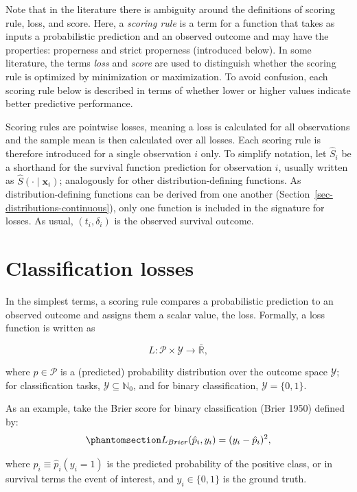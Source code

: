 \documentclass[
  letterpaper,
  krantz2]{style/krantz}
\begin{document}
Note that in the literature there is ambiguity around the definitions of
scoring rule, loss, and score. Here, a \emph{scoring rule} is a term for
a function that takes as inputs a probabilistic prediction and an
observed outcome and may have the properties: properness and strict
properness (introduced below). In some literature, the terms \emph{loss}
and \emph{score} are used to distinguish whether the scoring rule is
optimized by minimization or maximization. To avoid confusion, each
scoring rule below is described in terms of whether lower or higher
values indicate better predictive performance.

Scoring rules are pointwise losses, meaning a loss is calculated for all
observations and the sample mean is then calculated over all losses.
Each scoring rule is therefore introduced for a single observation \(i\)
only. To simplify notation, let \(\hat{S}_i\) be a shorthand for the
survival function prediction for observation \(i\), usually written as
\(\hat{S}(\cdot \mid \mathbf{x}_i)\); analogously for other
distribution-defining functions. As distribution-defining functions can
be derived from one another
(Section~\ref{sec-distributions-continuous}), only one function is
included in the signature for losses. As usual, \((t_i, \delta_i)\) is
the observed survival outcome.

\section{Classification losses}\label{classification-losses}

In the simplest terms, a scoring rule compares a probabilistic
prediction to an observed outcome and assigns them a scalar value, the
loss. Formally, a loss function is written as

\[
L: \mathcal{P}\times \mathcal{Y}\to \bar{\mathbb{R}},
\]

where \(p \in \mathcal{P}\) is a (predicted) probability distribution
over the outcome space \(\mathcal{Y}\); for classification tasks,
\(\mathcal{Y}\subseteq \mathbb{N}_0\), and for binary classification,
\(\mathcal{Y}= \{0,1\}\).

As an example, take the Brier score for binary
classification (Brier 1950) defined
by: \begin{equation}\phantomsection\label{eq-brier}{
L_{Brier}(\hat{p}_i, y_i) = (y_i - \hat{p}_i)^2,
}\end{equation}

where \(\hat{p}_i \equiv \hat{p}_i(y_i = 1)\) is the predicted
probability of the positive class, or in survival terms the event of
interest, and \(y_i \in \{0,1\}\) is the ground truth.
\end{document}
